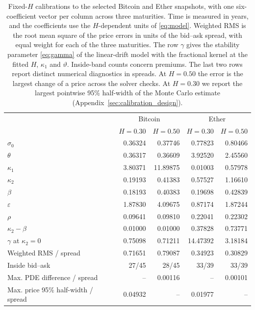 \documentclass[11pt,a4paper]{article}
\theoremstyle{definition}
\begin{document}
\begin{table}[!ht]
\centering\small
\caption{Fixed-$H$ calibrations to the selected Bitcoin and Ether snapshots, with one six-coefficient vector per column across three maturities. Time is measured in years, and the coefficients use the $H$-dependent units of \eqref{eq:model}. Weighted RMS is the root mean square of the price errors in units of the bid--ask spread, with equal weight for each of the three maturities. The row $\gamma$ gives the stability parameter \eqref{eq:gamma} of the linear-drift model with the fractional kernel at the fitted $H$, $\kappa_1$ and $\vartheta$. Inside-band counts concern premiums. The last two rows report distinct numerical diagnostics in spreads. At $H=0.50$ the error is the largest change of a price across the solver checks. At $H=0.30$ we report the largest pointwise 95\% half-width of the Monte Carlo estimate (Appendix~\ref{sec:calibration_design}). }\label{tab:calibration}
\setlength{\tabcolsep}{5pt}
\begin{tabular}{lrrrr}\toprule
 & \multicolumn{2}{c}{Bitcoin} & \multicolumn{2}{c}{Ether} \\
 & $H=0.30$ & $H=0.50$ & $H=0.30$ & $H=0.50$ \\
\midrule
$\sigma_0$ & 0.36324 & 0.37746 & 0.77823 & 0.80466 \\
$\theta$ & 0.36317 & 0.36609 & 3.92520 & 2.45560 \\
$\kappa_1$ & 3.80371 & 11.89875 & 0.01003 & 0.57978 \\
$\kappa_2$ & 0.19193 & 0.41383 & 0.57527 & 1.16610 \\
$\beta$ & 0.18193 & 0.40383 & 0.19698 & 0.42839 \\
$\varepsilon$ & 1.87830 & 4.09675 & 0.87174 & 1.87244 \\
\midrule
$\rho$ & 0.09641 & 0.09810 & 0.22041 & 0.22302 \\
$\kappa_2-\beta$ & 0.01000 & 0.01000 & 0.37828 & 0.73771 \\
$\gamma$ at $\kappa_2=0$ & 0.75098 & 0.71211 & 14.47392 & 3.18184 \\
Weighted RMS / spread & 0.71651 & 0.79087 & 0.34923 & 0.30829 \\
Inside bid--ask & 27/45 & 28/45 & 33/39 & 33/39 \\
Max. PDE difference / spread & -- & 0.00116 & -- & 0.00101 \\
Max. price 95\% half-width / spread & 0.04932 & -- & 0.01977 & -- \\
\bottomrule
\end{tabular}
\end{table}
\end{document}
